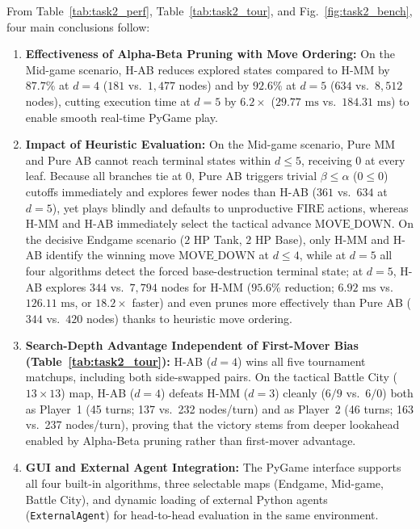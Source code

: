 From Table~\ref{tab:task2_perf}, Table~\ref{tab:task2_tour}, and Fig.~\ref{fig:task2_bench}, four main conclusions follow:
\begin{enumerate}
    \item \textbf{Effectiveness of Alpha-Beta Pruning with Move Ordering:} On the Mid-game scenario, H-AB reduces explored states compared to H-MM by $87.7\%$ at $d = 4$ ($181$ vs.\ $1{,}477$ nodes) and by $92.6\%$ at $d = 5$ ($634$ vs.\ $8{,}512$ nodes), cutting execution time at $d = 5$ by $6.2\times$ ($29.77\text{ ms}$ vs.\ $184.31\text{ ms}$) to enable smooth real-time PyGame play.
    \item \textbf{Impact of Heuristic Evaluation:} On the Mid-game scenario, Pure MM and Pure AB cannot reach terminal states within $d \le 5$, receiving $0$ at every leaf. Because all branches tie at $0$, Pure AB triggers trivial $\beta \le \alpha$ ($0 \le 0$) cutoffs immediately and explores fewer nodes than H-AB ($361$ vs.\ $634$ at $d = 5$), yet plays blindly and defaults to unproductive $\text{FIRE}$ actions, whereas H-MM and H-AB immediately select the tactical advance $\text{MOVE\_DOWN}$. On the decisive Endgame scenario ($2\text{ HP}$ Tank, $2\text{ HP}$ Base), only H-MM and H-AB identify the winning move $\text{MOVE\_DOWN}$ at $d \le 4$, while at $d = 5$ all four algorithms detect the forced base-destruction terminal state; at $d = 5$, H-AB explores $344$ vs.\ $7{,}794$ nodes for H-MM ($95.6\%$ reduction; $6.92\text{ ms}$ vs.\ $126.11\text{ ms}$, or $18.2\times$ faster) and even prunes more effectively than Pure AB ($344$ vs.\ $420$ nodes) thanks to heuristic move ordering.
    \item \textbf{Search-Depth Advantage Independent of First-Mover Bias (Table~\ref{tab:task2_tour}):} H-AB ($d = 4$) wins all five tournament matchups, including both side-swapped pairs. On the tactical Battle City ($13\times 13$) map, H-AB ($d = 4$) defeats H-MM ($d = 3$) cleanly ($6/9$ vs.\ $6/0$) both as Player~1 (45 turns; 137 vs.\ 232 nodes/turn) and as Player~2 (46 turns; 163 vs.\ 237 nodes/turn), proving that the victory stems from deeper lookahead enabled by Alpha-Beta pruning rather than first-mover advantage.
    \item \textbf{GUI and External Agent Integration:} The PyGame interface supports all four built-in algorithms, three selectable maps (Endgame, Mid-game, Battle City), and dynamic loading of external Python agents (\texttt{ExternalAgent}) for head-to-head evaluation in the same environment.
\end{enumerate}